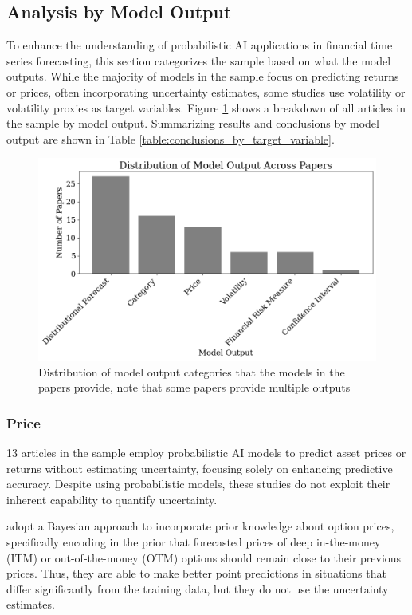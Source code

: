 \subsection{Analysis by Model Output}
\label{sec:analysis_by_model_output}
To enhance the understanding of probabilistic AI applications in financial time series forecasting, this section categorizes the sample based on what the model outputs. While the majority of models in the sample focus on predicting returns or prices, often incorporating uncertainty estimates, some studies use volatility or volatility proxies as target variables. Figure \ref{fig:model_output} shows a breakdown of all articles in the sample by model output. Summarizing results and conclusions by model output are shown in Table \ref{table:conclusions_by_target_variable}.

\begin{figure}[H]
    \centering
    \includegraphics[width=1\linewidth]{Images/model_output.png}
    \caption{Distribution of model output categories that the models in the papers provide, note that some papers provide multiple outputs }
    \label{fig:model_output}
\end{figure}

\subsubsection{Price}
13 articles in the sample employ probabilistic AI models to predict asset prices or returns without estimating uncertainty, focusing solely on enhancing predictive accuracy. Despite using probabilistic models, these studies do not exploit their inherent capability to quantify uncertainty.

\textcite{jang2018generative} adopt a Bayesian approach to incorporate prior knowledge about option prices, specifically encoding in the prior that forecasted prices of deep in-the-money (ITM) or out-of-the-money (OTM) options should remain close to their previous prices. Thus, they are able to make better point predictions in situations that differ significantly from the training data, but they do not use the uncertainty estimates.

